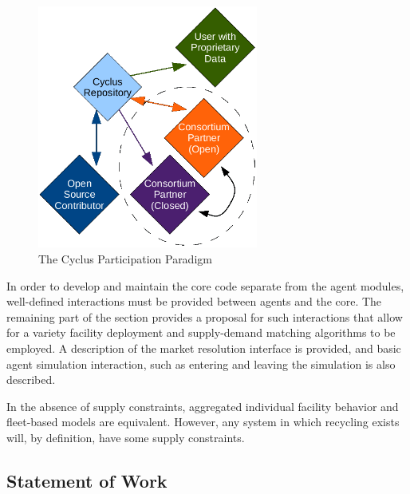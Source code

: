\begin{figure}[htbp!]
  \begin{center}
    \includegraphics[height=8cm]{./figs/community.png}
  \end{center}
  \caption{The Cyclus Participation Paradigm} 
  \label{fig:community}
\end{figure}

In order to develop and maintain the core code separate from the agent modules,
well-defined interactions must be provided between agents and the \Cyclus
core. The remaining part of the section provides a proposal for such
interactions that allow for a variety facility deployment and supply-demand
matching algorithms to be employed. A description of the market resolution
interface is provided, and basic agent simulation interaction, such as entering
and leaving the simulation is also described.

In the absence of supply constraints, aggregated
individual facility behavior and fleet-based models are equivalent. However, any
system in which recycling exists will, by definition, have some supply
constraints.

\subsection{Statement of Work}

